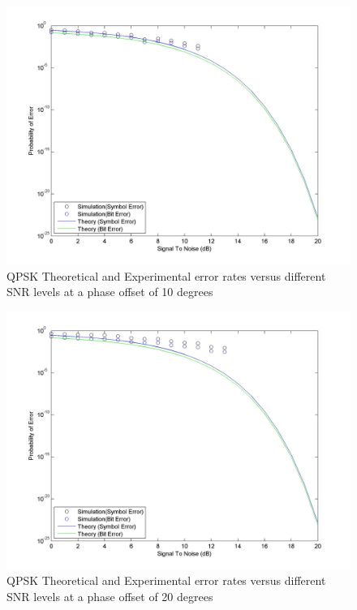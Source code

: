 \documentclass[]{article}
\begin{document}
\begin{figure}[H]
\centering
\hspace*{-2cm}\includegraphics[width=1.3\textwidth]{qpSNRpo2.jpg}
\caption{QPSK Theoretical and Experimental error rates versus different SNR levels at a phase offset of 10 degrees }
\end{figure}

\begin{figure}[H]
\centering
\hspace*{-2cm}\includegraphics[width=1.3\textwidth]{qpSNRpo3.jpg}
\caption{QPSK Theoretical and Experimental error rates versus different SNR levels at a phase offset of 20 degrees }
\end{figure}
\end{document}
